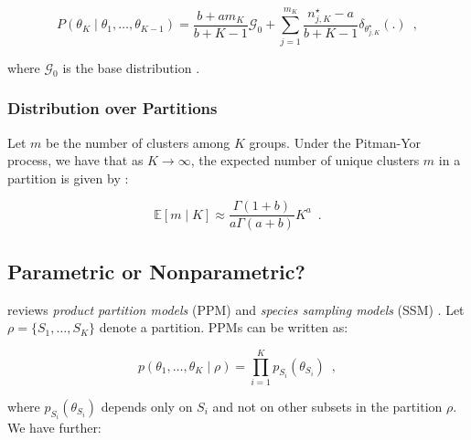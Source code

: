 \documentclass[]{article}
\begin{document}
\begin{equation}
    P(\theta_K \mid \theta_1, \ldots, \theta_{K - 1}) = \frac{b + a m_K}{b + K - 1} \mathcal{G}_0 + \sum^{m_K}_{j = 1} \frac{n^{\star}_{j, K} - a}{b + K - 1} \delta_{\theta^{\star}_{j, K}}(.) \enspace ,
\end{equation}

where $\mathcal{G}_0$ is the base distribution \parencite{ishwaran2001gibbs, pitman1997two}.

\subsubsection{Distribution over Partitions}
Let $m$ be the number of clusters among $K$ groups. Under the Pitman-Yor process, we have that as $K \rightarrow \infty$, the expected number of unique clusters $m$ in a partition is given by \parencite[e.g.,][]{wallach2010alternative}:

\begin{equation}
    \mathbb{E}[m \mid K] \approx \frac{\Gamma\left(1 + b\right)}{a\Gamma\left(a + b\right)}K^a \enspace .
\end{equation}



\subsection{Parametric or Nonparametric?}
\textcite{quintana2006predictive} reviews \textit{product partition models} (PPM) and \textit{species sampling models} (SSM) \parencite{ishwaran2003generalized, pitman1996some}. Let $\rho = \{S_1, \ldots, S_K\}$ denote a partition. PPMs can be written as:

\begin{equation}
    p(\theta_1, \ldots, \theta_K \mid \rho) = \prod_{i=1}^K p_{S_i}(\theta_{S_i}) \enspace ,
\end{equation}

where $p_{S_i}(\theta_{S_i})$ depends only on $S_i$ and not on other subsets in the partition $\rho$. We have further:
\end{document}
